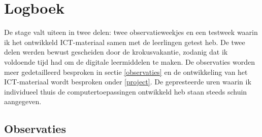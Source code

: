 \documentclass[a4paper,11pt]{article}
\theoremstyle{definition}
\begin{document}
\section{Logboek}\label{logboek}
De stage valt uiteen in twee delen: twee observatieweekjes en een testweek waarin ik het ontwikkeld ICT-materiaal samen
met de leerlingen getest heb. De twee delen werden bewust gescheiden door de krokusvakantie, zodanig dat ik voldoende tijd had 
om de digitale leermiddelen te maken. De observaties worden meer gedetailleerd besproken in sectie \ref{observaties} en de ontwikkeling
van het ICT-materiaal wordt besproken onder \ref{project}. De gepresteerde uren waarin ik 
individueel thuis de computertoepassingen ontwikkeld heb staan steeds schuin 
aangegeven.
\subsection{Observaties}
\end{document}
